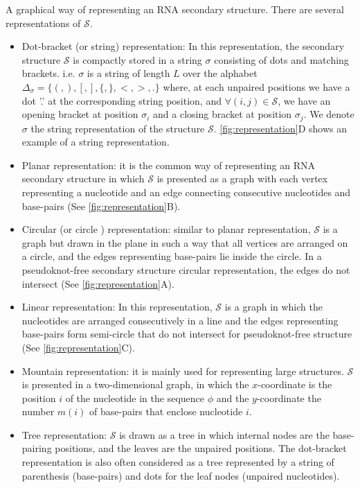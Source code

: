 \begin{mydef}
	\label{def:ss_representation}
	A graphical way of representing an \ac{RNA} secondary structure. There are several representations of $\mathcal{S}$. 
	\begin{itemize}
		\item Dot-bracket (or string) representation: In this representation, the secondary structure $\mathcal{S}$  is compactly stored in a string $\sigma$ consisting of dots and matching brackets. i.e.  $\sigma$ is a string of length $L$ over the alphabet $\Delta_{\sigma}= \big\{ (,),[,],\{,\},<,>,.\big\}$ where, at each unpaired positions we have a dot '.' at the corresponding string position, and $\forall (i,j) \in \mathcal{S}$, we have an opening bracket at position $\sigma_i$ and a closing bracket at position $\sigma_j$. We denote $\sigma$ the string representation of the structure $\mathcal{S}$. \autoref{fig:representation}D shows an example of a string representation.
		\item Planar representation: it is the common way of representing an \ac{RNA} secondary structure in which $\mathcal{S}$ is presented as a graph with each vertex representing a nucleotide  and an edge connecting consecutive nucleotides and base-pairs (See \autoref{fig:representation}B). 
		\item Circular (or circle ) representation: similar to planar representation, $\mathcal{S}$  is a graph but drawn in the plane in such a way that all vertices are arranged on a circle, and the edges representing base-pairs lie inside the circle. In a pseudoknot-free secondary structure circular representation, the edges do not intersect (See \autoref{fig:representation}A).  
		\item Linear representation: In this representation, $\mathcal{S}$  is a graph in which the nucleotides are arranged consecutively in a line and the edges representing base-pairs form semi-circle that do not intersect for pseudoknot-free structure (See \autoref{fig:representation}C).
		\item Mountain representation: it is mainly used for representing large structures. $\mathcal{S}$  is presented in a two-dimensional graph, in which the $x$-coordinate is the position $i$ of the nucleotide in the sequence $\phi$ and the $y$-coordinate the number $m(i)$ of base-pairs that enclose nucleotide $i$.
		\item Tree representation: $\mathcal{S}$  is drawn as a tree in which internal nodes are the base-pairing positions, and the leaves are the unpaired positions. The dot-bracket representation is also often considered as a tree represented by a string of parenthesis (base-pairs) and dots for the leaf nodes (unpaired nucleotides). 

\end{itemize}
\end{mydef}
